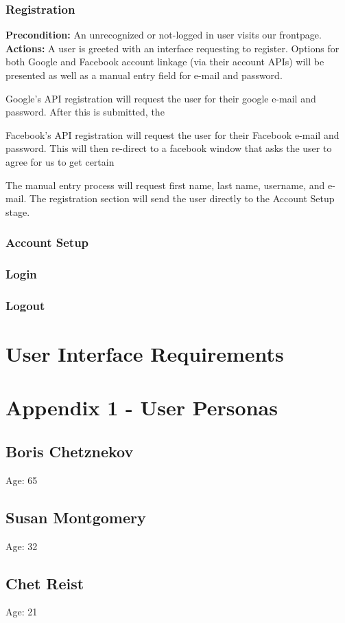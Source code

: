 \documentclass[a4paper,12pt]{article}
\begin{document}
\subsubsection{Registration}
\textbf{Precondition:} An unrecognized or not-logged in user visits our frontpage.
\textbf{Actions:} A user is greeted with an interface requesting to register.  Options for both Google and Facebook account linkage (via their account APIs) will be presented as well as a manual entry field for e-mail and password. \begin{list}{•}{•}
\item Google's API registration will request the user for their google e-mail and password.  After this is submitted, the
\item Facebook's API registration will request the user for their Facebook e-mail and password.  This will then re-direct to a facebook window that asks the user to agree for us to get certain 
\item The manual entry process will request first name, last name, username, and e-mail.  The registration section will send the user directly to the Account Setup stage.

\end{list}
\subsubsection{Account Setup}
\subsubsection{Login}

\subsubsection{Logout}

\section*{User Interface Requirements}

\newpage 
\section*{Appendix 1 - User Personas}
\subsection*{Boris Chetznekov}
Age: 65
\subsection*{Susan Montgomery}
Age: 32
\subsection*{Chet Reist}
Age: 21
\end{document}
